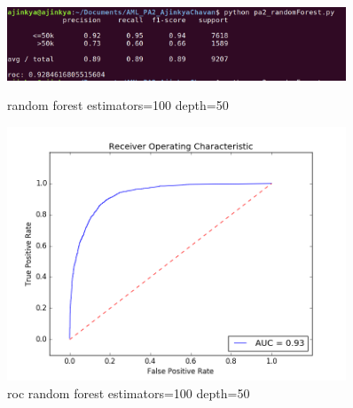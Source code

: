 \documentclass{article}
\begin{document}
\begin{figure}
    \centering
    \begin{minipage}{0.45\textwidth}
        \centering
        \includegraphics[width=0.9\textwidth]{random_100_50.png} %
        \caption{random forest estimators=100 depth=50}
    \end{minipage}\hfill
    \begin{minipage}{0.45\textwidth}
        \centering
        \includegraphics[width=0.9\textwidth]{roc_random_100_50.png} %
        \caption{roc random forest estimators=100 depth=50}
    \end{minipage}
\end{figure}
\end{document}

